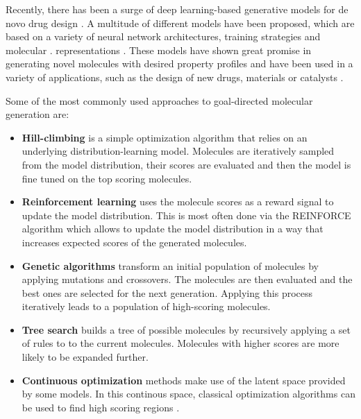 Recently, there has been a surge of deep learning-based generative models for de novo drug
design \citep{eltonDeepLearningMolecular2019,sanchez-lengelingInverseMolecularDesign2018,duMachineLearningaidedGenerative2024}. A multitude of different models have been proposed,
which are based on a variety of neural network architectures, training strategies and molecular
\citep{eltonDeepLearningMolecular2019,sanchez-lengelingInverseMolecularDesign2018}.
representations \citep{eltonDeepLearningMolecular2019,sanchez-lengelingInverseMolecularDesign2018,pangDeepGenerativeModels2024,duMachineLearningaidedGenerative2024}.
These models have shown great promise in generating novel molecules with desired property profiles
and have been used in a variety of applications, such as the design of new drugs, materials or
catalysts \citep{todo}.

Some of the most commonly used approaches to goal-directed molecular generation are:
\begin{itemize}
      \item \textbf{Hill-climbing}
            \citep{seglerGeneratingFocusedMolecule2018,xieMARSMarkovMolecular2021} is a simple
            optimization algorithm that relies on an underlying distribution-learning model.
            Molecules are iteratively sampled from the model distribution, their scores are
            evaluated and then the model is fine tuned on the top scoring molecules. 
      \item \textbf{Reinforcement learning} uses the molecule scores as a reward signal to update the
            model distribution. This is most often done via the REINFORCE algorithm\citep{williamsSimpleStatisticalGradientfollowing1992} which allows 
            to update the model distribution in a way that increases expected scores of the generated 
            molecules. 
      \item \textbf{Genetic algorithms} transform an initial population of molecules by applying
            mutations and crossovers. The molecules are then evaluated and the best ones are selected for
            the next generation. Applying this process iteratively leads to a population of high-scoring
            molecules.
      \item \textbf{Tree search} builds a tree of possible molecules by recursively applying a set of rules to
            to the current molecules. Molecules with higher scores are more likely to be expanded further. 
      \item \textbf{Continuous optimization} methods make use of the latent space provided by some models. 
      In this continous space, classical optimization algorithms can be used to find high scoring regions
      \citep{winterEfficientMultiobjectiveMolecular2019,gomez-bombarelliAutomaticChemicalDesign2018}.
\end{itemize}

